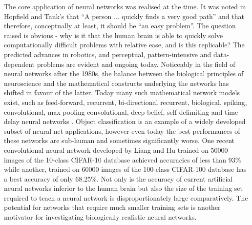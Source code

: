 \documentclass[11pt, twocolumn]{article}
\begin{document}
The core application of neural networks was realised at the time. It was noted in Hopfield and Tank's that ``A person ... quickly finds a very good path'' and that therefore, conceptually at least, it should be ``an easy problem''. The question raised is obvious - why is it that the human brain is able to quickly solve computationally difficult problems with relative ease, and is this replicable? The predicted advances in robotics, and perceptual, pattern-intensive and data-dependent problems \cite{hopfield1985neural} are evident and ongoing today. Noticeably in the field of neural networks after the 1980s, the balance between the biological principles of neuroscience and the mathematical constructs underlying the networks has shifted in favour of the latter. Today many such mathematical network models exist, such as feed-forward, recurrent, bi-directional recurrent, biological, spiking, convolutional, max-pooling convolutional, deep belief, self-delimiting and time delay neural networks \cite{schmidhuber2015deep}. Object classification is an example of a widely developed subset of neural net applications, however even today the best performances of these networks are sub-human and sometimes significantly worse. One recent convolutional neural network developed by Liang and Hu \cite{liang2015recurrent} trained on 50000 images of the 10-class \acs{CIFAR}-10 database achieved accuracies of less than 93\% while another, trained on 60000 images of the 100-class \acs{CIFAR}-100 database has a best accuracy of only 68.25\%. Not only is the accuracy of current artificial neural networks inferior to the human brain but also the size of the training set required to teach a neural network is disproportionately large comparatively. The potential for networks that require much smaller training sets is another motivator for investigating biologically realistic neural networks.
\end{document}

